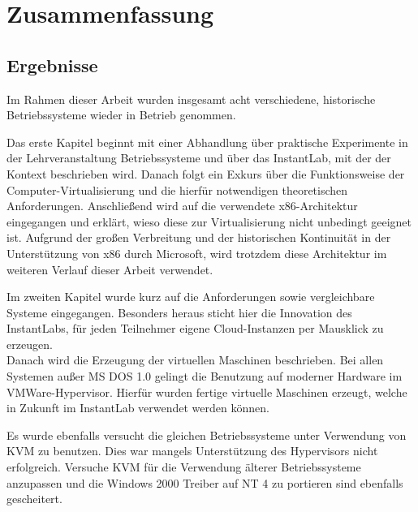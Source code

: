 \chapter{Zusammenfassung}
\label{chap:evaluation}


\section{Ergebnisse}
\label{sec:results}

	Im Rahmen dieser Arbeit wurden insgesamt acht verschiedene, historische Betriebssysteme wieder in Betrieb genommen.

	Das erste Kapitel beginnt mit einer Abhandlung über praktische Experimente in der Lehrveranstaltung Betriebssysteme und über das InstantLab, mit der der Kontext beschrieben wird.
	Danach folgt ein Exkurs über die Funktionsweise der Computer-Virtualisierung und die hierfür notwendigen theoretischen Anforderungen.
	Anschließend wird auf die verwendete x86-Architektur eingegangen und erklärt, wieso diese zur Virtualisierung nicht unbedingt geeignet ist. 
	Aufgrund der großen Verbreitung und der historischen Kontinuität in der Unterstützung von x86 durch Microsoft, wird trotzdem diese Architektur im weiteren Verlauf dieser Arbeit verwendet.

	Im zweiten Kapitel wurde kurz auf die Anforderungen sowie vergleichbare Systeme eingegangen.
	Besonders heraus sticht hier die Innovation des InstantLabs, für jeden Teilnehmer eigene Cloud-Instanzen per Mausklick zu erzeugen. \\ 

	Danach wird die Erzeugung der virtuellen Maschinen beschrieben.
	Bei allen Systemen außer MS DOS 1.0 gelingt die Benutzung auf moderner Hardware im VMWare-Hypervisor.
	Hierfür wurden fertige virtuelle Maschinen erzeugt, welche in Zukunft im InstantLab verwendet werden können.

	Es wurde ebenfalls versucht die gleichen Betriebssysteme unter Verwendung von KVM zu benutzen.
	Dies war mangels Unterstützung des Hypervisors nicht erfolgreich.
	Versuche KVM für die Verwendung älterer Betriebssysteme anzupassen und die Windows 2000 Treiber auf NT 4 zu portieren sind ebenfalls gescheitert.

